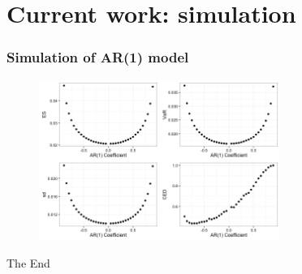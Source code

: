 \documentclass{beamer}
\newcommand\Fontviii{\fontsize{8}{9.2}\selectfont}
\begin{document}


\section{Current work: simulation}
\begin{frame}
\frametitle{Simulation of AR(1) model}
\Fontviii

\begin{figure}[h]
\centering 
\includegraphics[width=0.7\textwidth]{../figures/AR1_simulation}
\label{fig: CED3mon2yr}
\end{figure}

\end{frame}


\begin{frame}
\Huge{\centerline{The End}}
\end{frame}

\end{document}
